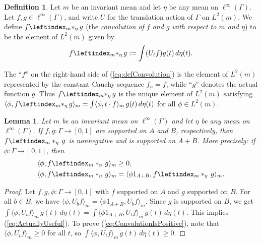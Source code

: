 \documentclass[12pt]{amsart} \usepackage{amsmath,centernot,amssymb,leftindex}
\newtheorem{lemma}[theorem]{Lemma}
\numberwithin{theorem}{section}
\numberwithin{equation}{section}
\theoremstyle{definition}
\newtheorem{definition}[theorem]{Definition}
\begin{document}
	\begin{definition}\label{def:nuEtaConvolution}
Let $m$ be an invariant mean and let $\eta$ be any mean on $\ell^{\infty}(\Gamma)$. Let $f,g\in \ell^\infty(\Gamma)$, and write $U$ for the translation action of $\Gamma$ on $L^{2}(m)$. We define $f\leftindex_{m}{*}_\eta\, g$  (the \emph{convolution of $f$ and $g$ with respect to $m$ and $\eta$}) to be the element of $L^{2}(m)$ given by
	\begin{equation}\label{eq:defConvolution}	
	f\leftindex_{m}{*}_\eta\, g := \int (U_t f) g(t)\, d\eta(t).
	\end{equation}
\end{definition}
The ``$f$'' on the right-hand side of (\ref{eq:defConvolution}) is  the element of $L^{2}(m)$ represented by the constant Cauchy sequence $f_{n}=f$, while ``$g$'' denotes the actual function $g$.  Thus $f\leftindex_{m}{*}_\eta\, g$ is the unique element of $L^{2}(m)$ satisfying $ \langle \phi,f\leftindex_{m}{*}_\eta\, g\rangle_{m} = \int \langle \phi, t \cdot f\rangle_{m}\, g(t)\, d\eta(t)$ for all $\phi\in L^{2}(m)$.
	
\begin{lemma}\label{lem:WeakSupportOnAplusB} Let $m$ be an invariant mean on $\ell^\infty(\Gamma)$ and let $\eta$ be any mean on $\ell^\infty(\Gamma)$. If $f,g:\Gamma\to [0,1]$ are supported on $A$ and  $B$, respectively, then $f\leftindex_m*_\eta\, g$ is nonnegative and is supported on $A+B$.  More precisely: if $\phi:\Gamma\to [0,1]$, then
\begin{align}\label{eq:ConvolutionIsPositive}
 \langle \phi, f\leftindex_m*_\eta\, g\rangle_{m} &\geq 0, \\
\label{eq:ActuallyUseful}
		\langle \phi, f\leftindex_m*_\eta\, g \rangle_m &=\langle \phi 1_{A+B}, f\leftindex_m*_\eta\, g\rangle_m .
	\end{align}
\end{lemma}



\begin{proof}
Let $f, g, \phi:\Gamma\to [0,1]$ with $f$ supported on $A$ and $g$ supported on $B$.  For all $b\in B$, we have  $\langle \phi , U_{b}f\rangle_{m} = \langle \phi 1_{A+B} , U_{b}f\rangle_{m}$. Since $g$ is supported on $B$, we get $\int \langle \phi,U_t f\rangle_{m}\, g(t) \, d\eta(t)= \int \langle \phi1_{A+B},U_t f\rangle_{m}\, g(t) \, d\eta(t)$. This implies (\ref{eq:ActuallyUseful}).
	To prove (\ref{eq:ConvolutionIsPositive}), note that  $\langle \phi, U_{t}f\rangle_{m}\geq 0$ for all $t$, so $\int \langle \phi, U_{t}f\rangle_{m}\, g(t)\, d\eta(t)\geq 0$.
\end{proof}
\end{document}
